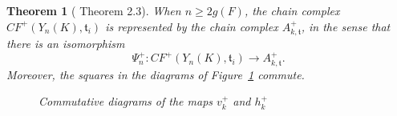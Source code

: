 \documentclass{article}
\newtheorem{theorem}[equation]{Theorem}
\theoremstyle{remark}
\numberwithin{equation}{section}
\numberwithin{table}{section}
\renewcommand{\frak}{\mathfrak}
\renewcommand{\(}{\left(}
\renewcommand{\)}{\right)}
\begin{document}
\begin{theorem}[\cite{oz-sz-integer} Theorem 2.3]\label{thm:oz-sz-2.3}
When $n\ge 2g(F)$, the chain complex $CF^+(Y_n(K),\frak t_i)$ is represented by the chain complex $A_{k,\frak t}^+$, in the sense that there is an isomorphism 
$$\Psi_n^+:CF^+(Y_n(K),\frak t_i)\to A_{k,\frak t}^+.$$ Moreover, the squares in the diagrams of Figure~\ref{fig:v-h-commutative-diagrams} commute.

\begin{figure}[h]
\centering
\begin{subfigure}[b]{0.45\textwidth}
\centering
\end{subfigure}
\hfill
\begin{subfigure}[b]{0.45\textwidth}
\centering
\end{subfigure}
\caption{Commutative diagrams of the maps $v_k^+$ and $h_k^+$}
\label{fig:v-h-commutative-diagrams}

\end{figure}

\end{theorem}
\end{document}
